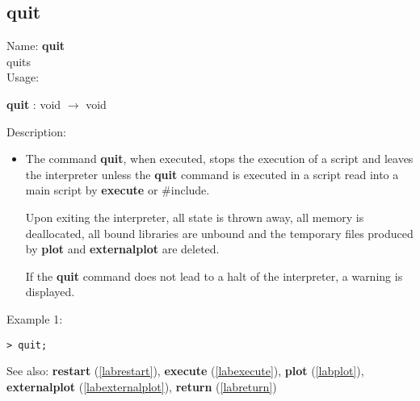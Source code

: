 \subsection{quit}
\label{labquit}
\noindent Name: \textbf{quit}\\
quits \sollya\\
\noindent Usage: 
\begin{center}
\textbf{quit} : \textsf{void} $\rightarrow$ \textsf{void}\\
\end{center}
\noindent Description: \begin{itemize}

\item The command \textbf{quit}, when executed, stops the execution of a \sollya
   script and leaves the \sollya interpreter unless the \textbf{quit} command 
   is executed in a \sollya script read into a main \sollya script by
   \textbf{execute} or $\#$include.
    
   Upon exiting the \sollya interpreter, all state is thrown away, all
   memory is deallocated, all bound libraries are unbound and the
   temporary files produced by \textbf{plot} and \textbf{externalplot} are deleted.
    
   If the \textbf{quit} command does not lead to a halt of the \sollya
   interpreter, a warning is displayed.
\end{itemize}
\noindent Example 1: 
\begin{center}\begin{minipage}{15cm}\begin{Verbatim}[frame=single]
> quit;
\end{Verbatim}
\end{minipage}\end{center}
See also: \textbf{restart} (\ref{labrestart}), \textbf{execute} (\ref{labexecute}), \textbf{plot} (\ref{labplot}), \textbf{externalplot} (\ref{labexternalplot}), \textbf{return} (\ref{labreturn})
